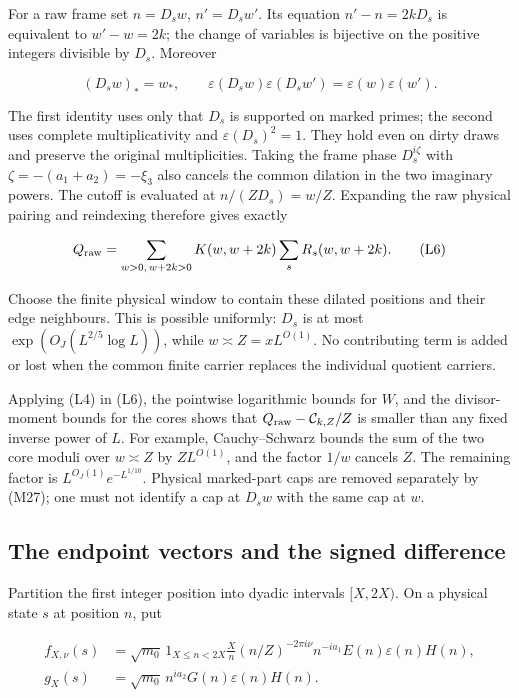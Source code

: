 For a raw frame set \(n=D_sw\), \(n'=D_sw'\). Its equation
\(n'-n=2kD_s\) is equivalent to \(w'-w=2k\); the change of variables is
bijective on the positive integers divisible by \(D_s\). Moreover

\[
(D_sw)_*=w_*,\qquad
\varepsilon(D_sw)\varepsilon(D_sw')
 =\varepsilon(w)\varepsilon(w'). \tag{L5}
\]

The first identity uses only that \(D_s\) is supported on marked primes;
the second uses complete multiplicativity and \(\varepsilon(D_s)^2=1\).
They hold even on dirty draws and preserve the original multiplicities.
Taking the frame phase \(D_s^{i\zeta}\) with \(\zeta=-(a_1+a_2)=-\xi_3\)
also cancels the common dilation in the two imaginary powers. The cutoff
is evaluated at \(n/(ZD_s)=w/Z\). Expanding the raw physical pairing and
reindexing therefore gives exactly

\[
Q_{\rm raw}=
\sum_{w>0,\,w+2k>0}K(w,w+2k)\sum_s R_s(w,w+2k). \tag{L6}
\]

Choose the finite physical window to contain these dilated positions and
their edge neighbours. This is possible uniformly: \(D_s\) is at most
\(\exp(O_J(L^{2/5}\log L))\), while \(w\asymp Z=xL^{O(1)}\). No
contributing term is added or lost when the common finite carrier
replaces the individual quotient carriers.

Applying (L4) in (L6), the pointwise logarithmic bounds for \(W\), and
the divisor-moment bounds for the cores shows that
\(Q_{\rm raw}-\mathcal C_{k,Z}/Z\) is smaller than any fixed inverse
power of \(L\). For example, Cauchy--Schwarz bounds the sum of the two
core moduli over \(w\asymp Z\) by \(ZL^{O(1)}\), and the factor \(1/w\)
cancels \(Z\). The remaining factor is \(L^{O_J(1)}e^{-L^{1/10}}\).
Physical marked-part caps are removed separately by (M27); one must not
identify a cap at \(D_sw\) with the same cap at \(w\).


\hypertarget{physical-lift-the-endpoint-vectors-and-the-signed-difference}{%
\subsection{The endpoint vectors and the signed
difference}\label{physical-lift-the-endpoint-vectors-and-the-signed-difference}}

Partition the first integer position into dyadic intervals \([X,2X)\).
On a physical state \(s\) at position \(n\), put

\[
\begin{aligned}
f_{X,\nu}(s)&=\sqrt{m_0}\,1_{X\le n<2X}\frac Xn
 (n/Z)^{-2\pi i\nu}n^{-ia_1}E(n)\varepsilon(n)H(n),\\
g_X(s)&=\sqrt{m_0}\,n^{ia_2}G(n)\varepsilon(n)H(n).
\end{aligned} \tag{L7}
\]


